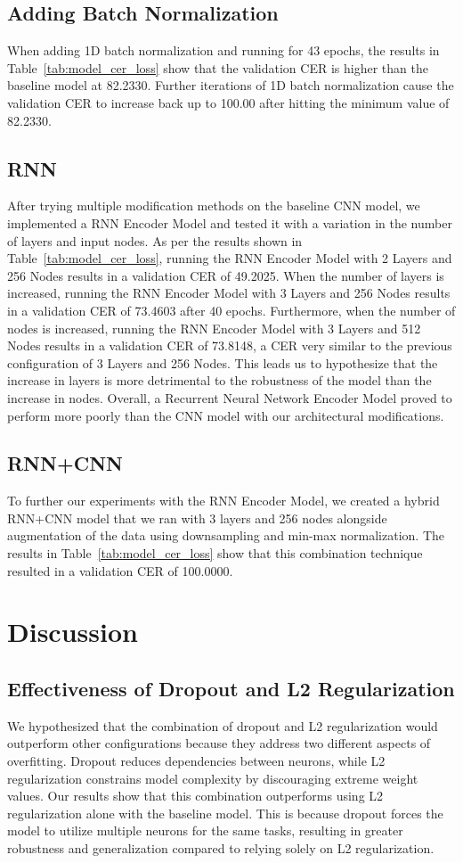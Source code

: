\documentclass{article}
\begin{document}
\subsection{Adding Batch Normalization}
When adding 1D batch normalization and running for 43 epochs, the results in {Table~\ref{tab:model_cer_loss}} show that the validation CER is higher than the baseline model at 82.2330. Further iterations of 1D batch normalization cause the validation CER to increase back up to 100.00 after hitting the minimum value of 82.2330. 
\subsection{RNN}
After trying multiple modification methods on the baseline CNN model, we implemented a RNN Encoder Model and tested it with a variation in the number of layers and input nodes. As per the results shown in {Table~\ref{tab:model_cer_loss}}, running the RNN Encoder Model with 2 Layers and 256 Nodes results in a validation CER of 49.2025. When the number of layers is increased, running the RNN Encoder Model with 3 Layers and 256 Nodes results in a validation CER of 73.4603 after 40 epochs. Furthermore, when the number of nodes is increased,  running the RNN Encoder Model with 3 Layers and 512 Nodes results in a validation CER of 73.8148, a CER very similar to the previous configuration of 3 Layers and 256 Nodes. This leads us to hypothesize that the increase in layers is more detrimental to the robustness of the model than the increase in nodes. Overall, a Recurrent Neural Network Encoder Model proved to perform more poorly than the CNN model with our architectural modifications. 
\subsection{RNN+CNN}
To further our experiments with the RNN Encoder Model, we created a hybrid RNN+CNN model that we ran with 3 layers and 256 nodes alongside augmentation of the data using downsampling and min-max normalization. The results in {Table~\ref{tab:model_cer_loss}} show that this combination technique resulted in a validation CER of 100.0000.

\section{Discussion}

\subsection{Effectiveness of Dropout and L2 Regularization}
We hypothesized that the combination of dropout and L2 regularization would outperform other configurations because they address two different aspects of overfitting. Dropout reduces dependencies between neurons, while L2 regularization constrains model complexity by discouraging extreme weight values. Our results show that this combination outperforms using L2 regularization alone with the baseline model. This is because dropout forces the model to utilize multiple neurons for the same tasks, resulting in greater robustness and generalization compared to relying solely on L2 regularization.
\end{document}
